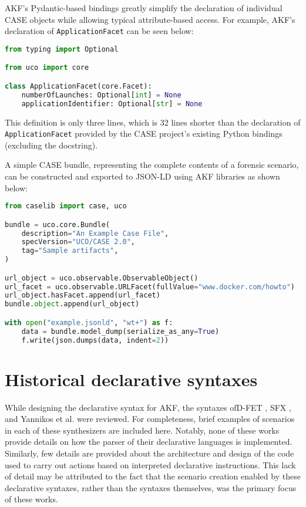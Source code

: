 \documentclass[letterpaper,12pt]{report}
\newcommand{\passthrough}[1]{#1}
\begin{document}
AKF's Pydantic-based bindings greatly simplify the declaration of
individual CASE objects while allowing typical attribute-based access.
For example, AKF's declaration of
\passthrough{\lstinline!ApplicationFacet!} can be seen below:

\begin{lstlisting}[language=Python]
from typing import Optional

from uco import core

class ApplicationFacet(core.Facet):
    numberOfLaunches: Optional[int] = None
    applicationIdentifier: Optional[str] = None
\end{lstlisting}

This definition is only three lines, which is 32 lines shorter than the
declaration of \passthrough{\lstinline!ApplicationFacet!} provided by
the CASE project's existing Python bindings (excluding the docstring).

A simple CASE bundle, representing the complete contents of a forensic
scenario, can be constructed and exported to JSON-LD using AKF libraries
as shown below:

\begin{lstlisting}[language=Python]
from caselib import case, uco

bundle = uco.core.Bundle(
    description="An Example Case File",
    specVersion="UCO/CASE 2.0",
    tag="Sample artifacts",
)

url_object = uco.observable.ObservableObject()
url_facet = uco.observable.URLFacet(fullValue="www.docker.com/howto")
url_object.hasFacet.append(url_facet)
bundle.object.append(url_object)

with open("example.jsonld", "wt+") as f:
    data = bundle.model_dump(serialize_as_any=True)
    f.write(json.dumps(data, indent=2))
\end{lstlisting}

\section{Historical declarative
syntaxes}\label{historical-declarative-syntaxes}

While designing the declarative syntax for AKF, the syntaxes ofD-FET
\cite{williamCloudbasedDigitalForensics2011}, SFX
\cite{russellForensicImageDescription2012}, and Yannikos et al.
\cite{yannikosDataCorporaDigital2014} were reviewed. For
completeness, brief examples of scenarios in each of these synthesizers
are included here. Notably, none of these works provide details on how
the parser of their declarative languages is implemented. Similarly, few
details are provided about the architecture and design of the code used
to carry out actions based on interpreted declarative instructions. This
lack of detail may be attributed to the fact that the scenario creation
enabled by these declarative syntaxes, rather than the syntaxes
themselves, was the primary focus of these works.
\end{document}
